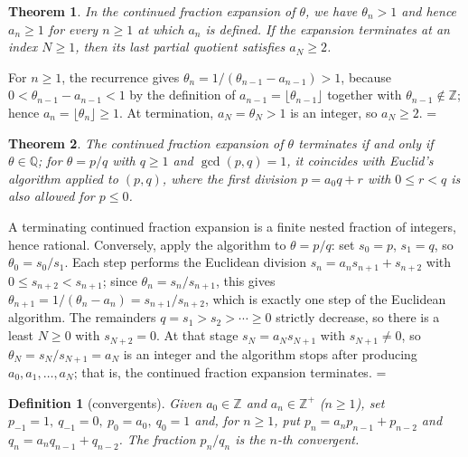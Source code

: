 \documentclass[11pt]{article}
\makeatletter
\let\nt@closedisplay\]
\def\nt@guardedclose{\@ifnextchar\par{\nt@closeafterpar}{\@ifnextchar\end{\postdisplaypenalty\@M\nt@closedisplay}{\nt@closedisplay}}}
\def\nt@closeafterpar\par{\@ifnextchar\par{\nt@closeafterpar}{\@ifnextchar\end{\postdisplaypenalty\@M\nt@closedisplay\par}{\nt@closedisplay\par}}}
\renewenvironment{proof}[1][\proofname]{\par
  \pushQED{\qed}\normalfont\topsep\medskipamount\edef\nt@afterproof{\@endparpenalty=\the\@endparpenalty\relax}\@beginparpenalty\@M\@endparpenalty\@M\let\]\nt@guardedclose\trivlist\item[]\textit{#1\@addpunct{.}} \ignorespaces}{\ifvmode\addpenalty\@M\fi\popQED\nt@afterproof\endtrivlist\@endpefalse}
\theoremstyle{ntstyle}
\newtheorem{theorem}{Theorem}[subsection]
\newtheorem{definition}{Definition}[subsection]
\makeatother
\begin{document}
\begin{theorem}\label{thm:10.3.1}
  In the continued fraction expansion of $\theta$, we have $\theta_n>1$ and
  hence $a_n\ge1$ for every $n\ge1$ at which $a_n$ is defined. If the
  expansion terminates at an index $N\ge1$, then its last partial quotient
  satisfies $a_N\ge2$.

\end{theorem}

\begin{proof} For $n\ge1$, the recurrence gives
  $\theta_n=1/(\theta_{n-1}-a_{n-1})>1$, because
  $0<\theta_{n-1}-a_{n-1}<1$ by the definition of $a_{n-1}=\lfloor \theta_{n-1}\rfloor$ together with
  $\theta_{n-1}\notin\mathbb{Z}$; hence
  $a_n=\lfloor\theta_n\rfloor\ge1$. At termination, $a_N=\theta_N>1$ is an
  integer, so $a_N\ge2$.
\end{proof}

\begin{theorem}\label{thm:10.3.2} The continued fraction expansion of $\theta$
  terminates if and only if $\theta\in\mathbb{Q}$; for $\theta=p/q$
  with $q\ge1$ and $\gcd(p, q)=1$, it coincides with Euclid's algorithm applied to $(p,q)$, where the first
  division $p=a_0q+r$ with $0\le r<q$ is also allowed for $p\le0$.

\end{theorem}

\begin{proof} A terminating continued fraction expansion is a finite nested
  fraction of integers, hence rational. Conversely, apply the algorithm to
  $\theta=p/q$: set $s_0=p$, $s_1=q$, so $\theta_0=s_0/s_1$. Each step performs
  the Euclidean division $s_n=a_ns_{n+1}+s_{n+2}$ with
  $0\le s_{n+2}<s_{n+1}$; since $\theta_n=s_n/s_{n+1}$, this gives
  $\theta_{n+1}=1/(\theta_n-a_n)=s_{n+1}/s_{n+2}$, which is exactly one step of the Euclidean algorithm. The
  remainders $q=s_1>s_2>\cdots\ge0$ strictly decrease,
  so there is a least $N\ge0$ with $s_{N+2}=0$. At that stage
  $s_N=a_Ns_{N+1}$ with $s_{N+1}\neq0$, so
  $\theta_N=s_N/s_{N+1}=a_N$ is an integer and the algorithm stops after
  producing $a_0,a_1,\ldots,a_N$; that is, the continued fraction expansion
  terminates.
\end{proof}

\begin{definition}[convergents]\label{def:10.3.2}\label{def:convergents} Given
  $a_0\in\mathbb{Z}$ and $a_n\in\mathbb{Z}^+$ ($n\ge1$), set
  $p_{-1}=1,\ q_{-1}=0,\ p_0=a_0,\ q_0=1$ and, for $n\ge1$,
  put $p_n=a_np_{n-1}+p_{n-2}$ and $q_n=a_nq_{n-1}+q_{n-2}$. The fraction
  $p_n/q_n$ is the $n$-th convergent.

\end{definition}
\end{document}
